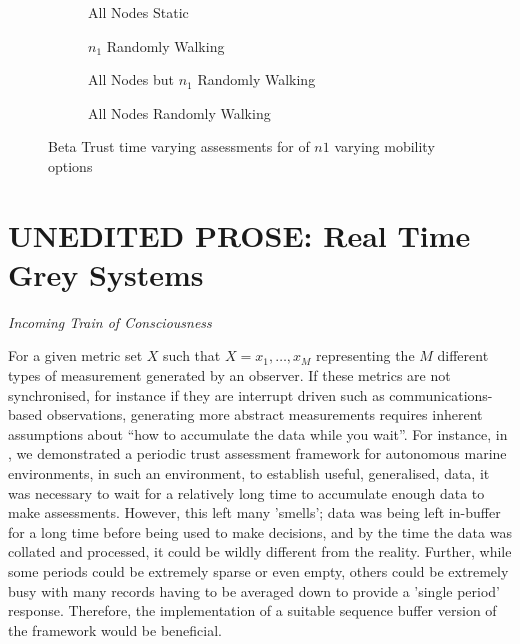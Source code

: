 \begin{figure}
\begin{subfigure}{0.5\textwidth}
  \centering
  \caption{All Nodes Static}
  \label{fig:beta_trust_static}
\end{subfigure}%
\begin{subfigure}{0.5\textwidth}
  \centering
  \caption{$n_1$ Randomly Walking}
  \label{fig:beta_trust_single}
\end{subfigure}%

\begin{subfigure}{0.5\textwidth}
\centering
  \caption{All Nodes but $n_1$ Randomly Walking}
  \label{fig:beta_trust_allbut1}
\end{subfigure}%
\begin{subfigure}{0.5\textwidth}
\centering
  \caption{All Nodes Randomly Walking}
  \label{fig:beta_trust_all_mobile}
\end{subfigure}
\caption{Beta Trust time varying assessments for of $n1$ varying mobility options}
\label{fig:trust_mobility}
\end{figure}



\section{UNEDITED PROSE: Real Time Grey Systems}
\emph{Incoming Train of Consciousness}


For a given metric set $X$ such that $X = {x_1,\dots,x_M}$ representing the $M$ different types of measurement generated by an observer. If these metrics are not synchronised, for instance if they are interrupt driven such as communications-based observations, generating more abstract measurements requires inherent assumptions about ``how to accumulate the data while you wait''. For instance, in \cite{Bolster2015}, we demonstrated a periodic trust assessment framework for autonomous marine environments, in such an environment, to establish useful, generalised, data, it was necessary to wait for a relatively long time to accumulate enough data to make assessments.
However, this left many 'smells'; data was being left in-buffer for a long time before being used to make decisions, and by the time the data was collated and processed, it could be wildly different from the reality. Further, while some periods could be extremely sparse or even empty, others could be extremely busy with many records having to be averaged down to provide a 'single period' response. 
Therefore, the implementation of a suitable sequence buffer version of the framework would be beneficial.

